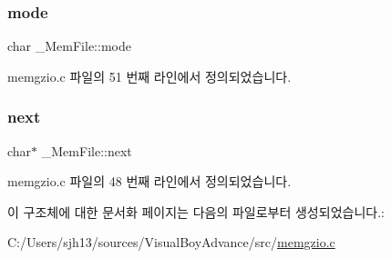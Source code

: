 \subsubsection{\texorpdfstring{mode}{mode}}
{\footnotesize\ttfamily char \+\_\+\+Mem\+File\+::mode}



memgzio.\+c 파일의 51 번째 라인에서 정의되었습니다.

\mbox{\label{struct___mem_file_aa15859f66ae2eb41245e4ba88486d67f}} 
\subsubsection{\texorpdfstring{next}{next}}
{\footnotesize\ttfamily char$\ast$ \+\_\+\+Mem\+File\+::next}



memgzio.\+c 파일의 48 번째 라인에서 정의되었습니다.



이 구조체에 대한 문서화 페이지는 다음의 파일로부터 생성되었습니다.\+:\begin{DoxyCompactItemize}
\item 
C\+:/\+Users/sjh13/sources/\+Visual\+Boy\+Advance/src/\mbox{\hyperlink{memgzio_8c}{memgzio.\+c}}\end{DoxyCompactItemize}
